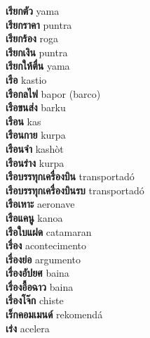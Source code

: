 \textbf{ เรียกตัว  } yama \\
\textbf{ เรียกราคา  } puntra \\
\textbf{ เรียกร้อง  } roga \\
\textbf{ เรียกเงิน  } puntra \\
\textbf{ เรียกให้ตื่น  } yama \\
\textbf{ เรือ  } kastio \\
\textbf{ เรือกลไฟ  } bapor (barco) \\
\textbf{ เรือขนส่ง  } barku \\
\textbf{ เรือน  } kas \\
\textbf{ เรือนกาย  } kurpa \\
\textbf{ เรือนจำ  } kashòt \\
\textbf{ เรือนร่าง  } kurpa \\
\textbf{ เรือบรรทุกเครื่องบิน  } transportadó \\
\textbf{ เรือบรรทุกเครื่องบินรบ  } transportadó \\
\textbf{ เรือเหาะ  } aeronave \\
\textbf{ เรือแคนู  } kanoa \\
\textbf{ เรือใบแฝด  } catamaran \\
\textbf{ เรื่อง  } acontecimento \\
\textbf{ เรื่องย่อ  } argumento \\
\textbf{ เรื่องอัปยศ  } baina \\
\textbf{ เรื่องอื้อฉาว  } baina \\
\textbf{ เรื่องโจ๊ก  } chiste \\
\textbf{ เร็กคอมเมนด์  } rekomendá \\
\textbf{ เร่ง  } acelera \\
